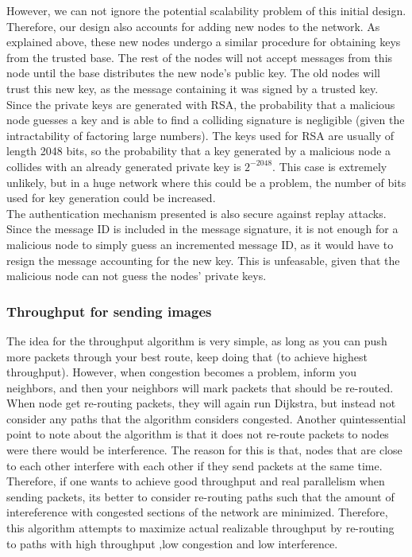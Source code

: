 \documentclass[letterpaper]{article}
\begin{document}
\noindent However, we can not ignore the potential scalability problem of this initial design. Therefore, our design also accounts for adding new nodes to the network. As explained above, these new nodes undergo a similar procedure for obtaining keys from the trusted base. The rest of the nodes will not accept messages from this node until the base distributes the new node's public key. The old nodes will trust this new key, as the message containing it was signed by a trusted key.
\\

\noindent Since the private keys are generated with RSA, the probability that a malicious node guesses a key and is able to find a colliding signature is negligible (given the intractability of factoring large numbers). The keys used for RSA are usually of length 2048 bits, so the probability that a key generated by a malicious node a collides with an already generated private key is $2^{-2048}$. This case is extremely unlikely, but in a huge network where this could be a problem, the number of bits used for key generation could be increased.\\

\noindent The authentication mechanism presented is also secure against replay attacks. Since the message ID is included in the message signature, it is not enough for a malicious node to simply guess an incremented message ID, as it would have to resign the message accounting for the new key. This is unfeasable, given that the malicious node can not guess the nodes' private keys.

\subsubsection{Throughput for sending images}

The idea for the throughput algorithm is very simple, as long as you can push more packets through your best route, keep doing that (to achieve highest throughput). However, when congestion becomes a problem, inform you neighbors, and then your neighbors will mark packets that should be re-routed. When node get re-routing packets, they will again run Dijkstra, but instead not consider any paths that the algorithm considers congested. Another quintessential point to note about the algorithm is that it does not re-route packets to nodes were there would be interference. The reason for this is that, nodes that are close to each other interfere with each other if they send packets at the same time. Therefore, if one wants to achieve good throughput and real parallelism when sending packets, its better to consider re-routing paths such that the amount of intereference with congested sections of the network are minimized. Therefore, this algorithm attempts to maximize actual realizable throughput by re-routing to paths with high throughput ,low congestion and low interference.
\end{document}
